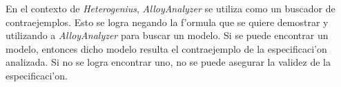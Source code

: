 En el contexto de \textit{Heterogenius}, \textit{AlloyAnalyzer} se utiliza como un buscador de contraejemplos. Esto se logra negando la f'ormula que se quiere demostrar y utilizando a \textit{AlloyAnalyzer} para buscar un modelo. Si se puede encontrar un modelo, entonces dicho modelo resulta el contraejemplo de la especificaci'on analizada. Si no se logra encontrar uno, no se puede asegurar la validez de la especificaci'on.